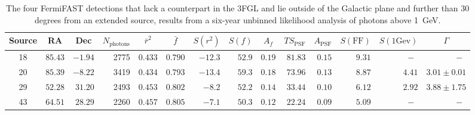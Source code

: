 \documentclass[useAMS,usenatbib]{mn2e}
\begin{document}
\begin{table}
  \caption{The four FermiFAST detections that lack a
    counterpart in the 3FGL and lie outside of the Galactic plane and
    further than 30 degrees from an extended source, results from a
    six-year unbinned likelihood analysis of photons above 1~GeV.}
  \label{tab:fermisig1GeV}
\begin{tabular}{crrrrrrrrrrrrr}
    \hline
    Source & \multicolumn{1}{c}{RA} & \multicolumn{1}{c}{Dec}  & \multicolumn{1}{c}{$N_\mathrm{photons}$}  &\multicolumn{1}{c}{$\bar r^2$} & \multicolumn{1}{c}{$\bar f$} & \multicolumn{1}{c}{$S(r^2)$} & \multicolumn{1}{c}{$S(f)$} & \multicolumn{1}{c}{$A_f$} & \multicolumn{1}{c}{$TS_\mathrm{PSF}$} & \multicolumn{1}{c}{$A_\mathrm{PSF}$} & \multicolumn{1}{c}{$S(\mathrm{FF})$} & \multicolumn{1}{c}{$S(\mathrm{1Gev})$}  & \multicolumn{1}{c}{$\Gamma$}
 \\
    \hline
   18  & $ 85.43$ & $ -1.94$ &   2775 & $0.433$ & $0.790$ & $ -12.3$ & $  52.9$ & $0.19$ & $    81.83$ & $0.15$ & $     9.31$ & $~-~$    & $~-~$\\ 
   20  & $ 85.39$ & $ -8.22$ &   3419 & $0.434$ & $0.793$ & $ -13.4$ & $  59.3$ & $0.18$ & $    73.96$ & $0.13$ & $     8.87$ & $4.41$ & $3.01\pm0.01$ \\
   29  & $ 52.28$ & $ 31.20$ &   2493 & $0.453$ & $0.802$ & $  -8.2$ & $  52.2$ & $0.14$ & $    33.44$ & $0.10$ & $     6.12$ & $2.92$ & $3.88\pm1.75$ \\
   43  & $ 64.51$ & $ 28.29$ &   2260 & $0.457$ & $0.805$ & $  -7.1$ & $  50.3$ & $0.12$ & $    22.24$ & $0.09$ & $     5.09$ & $~-~$    & $~-~$ \\ 
\end{tabular}
\end{table}


\end{document}
